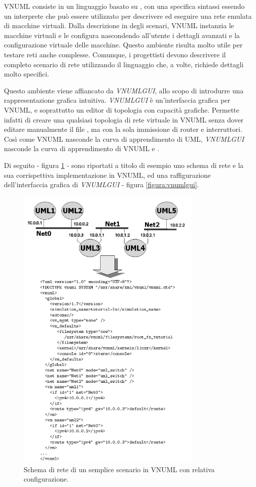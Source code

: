 VNUML consiste in un linguaggio basato su \xml{}, con una specifica sintassi essendo un interprete che può essere utilizzato per descrivere ed eseguire una rete emulata di macchine virtuali.
Dalla descrizione in \xml{} degli scenari, VNUML instanzia le macchine virtuali e le configura nascondendo all'utente i dettagli avanzati e la configurazione virtuale delle macchine. Questo ambiente risulta molto utile per testare reti anche complesse. Comunque, i progettisti devono descrivere il completo scenario di rete utilizzando il linguaggio \xml{} che, a volte, richiede dettagli molto specifici.

Questo ambiente viene affiancato da \emph{VNUMLGUI}\cite{VNUMLGUI}, allo scopo di introdurre una rappresentazione grafica intuitiva. \emph{VNUMLGUI} è un'interfaccia grafica per VNUML, e soprattutto un editor di topologia con capacità grafiche. Permette infatti di creare una qualsiasi topologia di rete virtuale in VNUML senza dover editare manualmente il file \xml{}, ma con la sola immissione di router e interruttori.
Così come VNUML nasconde la curva di apprendimento di UML, \emph{VNUMLGUI} nasconde la curva di apprendimento di VNUML e \xml{}.

Di seguito - figura \ref{figura:vnuml_gui} - sono riportati a titolo di esempio uno schema di rete e la sua corrispettiva implementazione in VNUML, ed una raffigurazione dell'interfaccia grafica di \emph{VNUMLGUI} - figura \ref{figura:vnumlgui}.

\begin{figure}[!ht]
	\centering
	\includegraphics[width=9cm]{images/vnuml_01.png}
	\caption{Schema di rete di un semplice scenario in VNUML con relativa configurazione.}
	\label{figura:vnuml_gui}
\end{figure}

